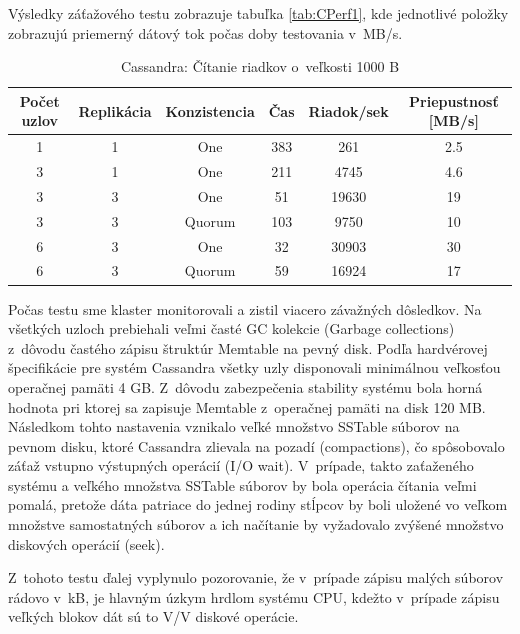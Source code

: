 \documentclass[11pt,twoside,a4paper]{book}
\begin{document}
Výsledky záťažového testu zobrazuje tabuľka \ref{tab:CPerf1}, kde jednotlivé položky zobrazujú priemerný dátový tok počas doby testovania v~MB/s.
\begin{table}[hp]
\begin{center}
\begin{tabular}{|c|c|c|c|c|c|}
\hline Počet uzlov & Replikácia & Konzistencia & Čas & Riadok/sek & Priepustnosť [MB/s]\\ 
\hline
\hline 1 & 1 & One & 383 & 261 & 2.5\\ 
\hline 3 & 1 & One & 211 & 4745 & 4.6\\ 
\hline 3 & 3 & One & 51 & 19630 & 19\\ 
\hline 3 & 3 & Quorum & 103 & 9750 & 10\\ 
\hline 6 & 3 & One & 32 & 30903 & 30\\ 
\hline 6 & 3 & Quorum & 59 & 16924 & 17\\ 
\hline
\end{tabular} 
\end{center}
\caption{Cassandra: Čítanie riadkov o~veľkosti 1000 B}
\label{tab:CPerf3}
\end{table}
Počas testu sme klaster monitorovali a zistil viacero závažných dôsledkov. Na všetkých uzloch prebiehali veľmi časté GC kolekcie (Garbage collections) z~dôvodu častého zápisu štruktúr Memtable na pevný disk. Podľa hardvérovej špecifikácie pre systém Cassandra všetky uzly disponovali minimálnou veľkosťou operačnej pamäti 4 GB. Z~dôvodu zabezpečenia stability systému bola horná hodnota pri ktorej sa zapisuje Memtable z~operačnej pamäti na disk 120 MB. Následkom tohto nastavenia vznikalo veľké množstvo SSTable súborov na pevnom disku, ktoré Cassandra zlievala na pozadí (compactions), čo spôsobovalo záťaž vstupno výstupných operácií (I/O wait). V~prípade, takto zaťaženého systému a veľkého množstva SSTable súborov by bola operácia čítania veľmi pomalá, pretože dáta patriace do jednej rodiny stĺpcov by boli uložené vo veľkom množstve samostatných súborov a ich načítanie by vyžadovalo zvýšené množstvo diskových operácií (seek).

Z~tohoto testu ďalej vyplynulo pozorovanie, že v~prípade zápisu malých súborov rádovo v~kB, je hlavným úzkym hrdlom systému CPU, kdežto v~prípade zápisu veľkých blokov dát sú to V/V diskové operácie.
\end{document}
